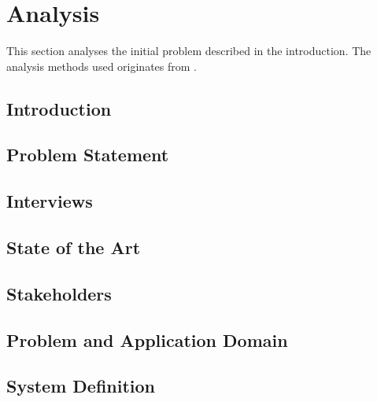\chapter{Analysis}

This section analyses the initial problem described in the introduction. The analysis methods used originates from \cite{mathiassen2001objektorienteret}. 

\section{Introduction}


\section{Problem Statement}


\section{Interviews}




\section{State of the Art}


\section{Stakeholders}


\section{Problem and Application Domain}


\section{System Definition}

